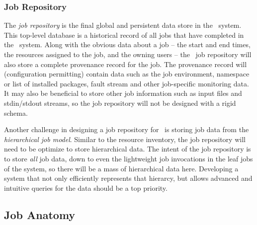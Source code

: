 \subsubsection{Job Repository}

\ifcomments
{}
\fi

The \emph{job repository} is the final global and persistent
data store in the \ngrm\ system. This top-level database is a
historical record of all jobs that have completed in the
\ngrm\ system. Along with the obvious data about a job --
the start and end times, the resources assigned to the job,
and the owning users -- the \ngrm\ job repository will also
store a complete provenance record for the job. The provenance
record will (configuration permitting) contain data such as the
job environment, namespace or list of installed packages, fault
stream and other job-specific monitoring data. It may also be
beneficial to store other job information such as input files
and stdin/stdout streams, so the job repository will not be
designed with a rigid schema.

Another challenge in designing a job repository for \ngrm\ is
storing job data from the \emph{hierarchical job model}. Similar
to the resource inventory, the job repository will need to be
optimize to store hierarchical data. The intent of the job
repository is to store \emph{all} job data, down to even the
lightweight job invocations in the leaf jobs of the system,
so there will be a mass of hierarchical data here. Developing
a system that not only efficiently represents that hierarcy,
but allows advanced and intuitive queries for the data should
be a top priority.

\subsection{Job Anatomy}
\label{sect:jobanatomy}

